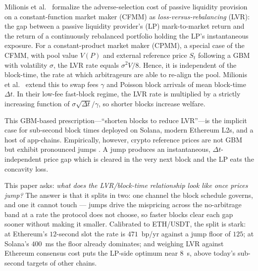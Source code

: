 \documentclass[runningheads]{llncs}
\newcommand{\dt}{\Delta t}
\newcommand{\1}{\mathbf{1}}
\begin{document}
Milionis et al.~\cite{milionis2022automated} formalize the adverse-selection cost of passive liquidity provision on a constant-function market maker (CFMM) as \emph{loss-versus-rebalancing} (LVR): the gap between a passive liquidity provider's (LP) mark-to-market return and the return of a continuously rebalanced portfolio holding the LP's instantaneous exposure. For a constant-product market maker (CPMM), a special case of the CFMM, with pool value $V(P)$ and external reference price $S_t$ following a GBM with volatility $\sigma$, the LVR rate equals $\sigma^2 V/8$. Hence, it is independent of the block-time, the rate at which arbitrageurs are able to re-align the pool. Milionis et al.~\cite{milionis2023automated} extend this to swap fees $\gamma$ and Poisson block arrivals of mean block-time $\dt$. In their low-fee fast-block regime, the LVR rate is multiplied by a strictly increasing function of $\sigma\sqrt{\dt}/\gamma$, so shorter blocks increase welfare.

This GBM-based prescription---``shorten blocks to reduce LVR''---is the implicit case for sub-second block times deployed on Solana, modern Ethereum L2s, and a host of app-chains. Empirically, however, crypto reference prices are not GBM but exhibit pronounced jumps \cite{scaillet2020high,chaim2019nonlinear,saef2024temporal}. A jump produces an instantaneous, $\dt$-independent price gap which is cleared in the very next block and the LP eats the concavity loss.

This paper asks: \emph{what does the LVR/block-time relationship look like once prices jump?} The answer is that it splits in two: one channel the block schedule governs, and one it cannot touch --- jumps drive the mispricing across the no-arbitrage band at a rate the protocol does not choose, so faster blocks clear each gap sooner without making it smaller. Calibrated to ETH/USDT, the split is stark: at Ethereum's $12$-second slot the rate is $471$~bp/yr against a jump floor of $125$; at Solana's $400$~ms the floor already dominates; and weighing LVR against Ethereum consensus cost puts the LP-side optimum near $8$~s, above today's sub-second targets of other chains.
\end{document}
